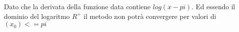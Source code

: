 
Dato che la derivata della funzione data contiene $log(x - pi)$.
Ed essendo il dominio del logaritmo \(R^+\) il metodo non potrà convergere per valori di $(x_0)<=pi$
